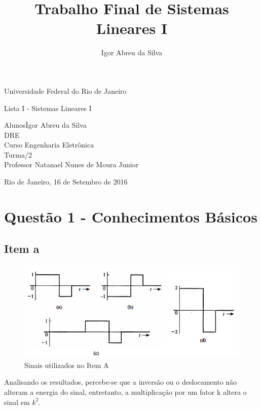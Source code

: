 \documentclass[a4paper, 12pt]{article}
\author{Igor Abreu da Silva}
\title{Trabalho Final de Sistemas Lineares I}
\begin{document}
    \begin{titlepage}
        \begin{center}
            \huge{Universidade Federal do Rio de Janeiro}
            \vspace{95pt}

            \large{Lista I - Sistemas Lineares I}
            \vspace{160pt}
        \end{center}

        \begin{flushleft}
            \begin{tabbing}
                Alunos\qquad\qquad\= Igor Abreu da Silva\\
                DRE \\
                Curso\> Engenharia Eletrônica \\
                Turma/2 \\
                Professor\> Natanael Nunes de Moura Junior \\

            \end{tabbing}

        \end{flushleft}

        \begin{center}
            \vspace{\fill}
            Rio de Janeiro, 16 de Setembro de 2016
        \end{center}
    \end{titlepage}

    \newpage
    \tableofcontents
    \listoffigures
    \thispagestyle{empty}
    \newpage

    \section{Quest\~{a}o 1 - Conhecimentos Básicos}
        \subsection{Item a}
            \begin{figure}[!ht]
                \centering
                \includegraphics{img/Figura1.PNG}
                \caption{Sinais utilizados no Item A}
            \end{figure}
            Analisando os resultados, percebe-se que a inversão ou o deslocamento não alteram a energia do sinal, entretanto, a multiplicação por um fator k altera o sinal em $k^{2}$.
\end{document}
